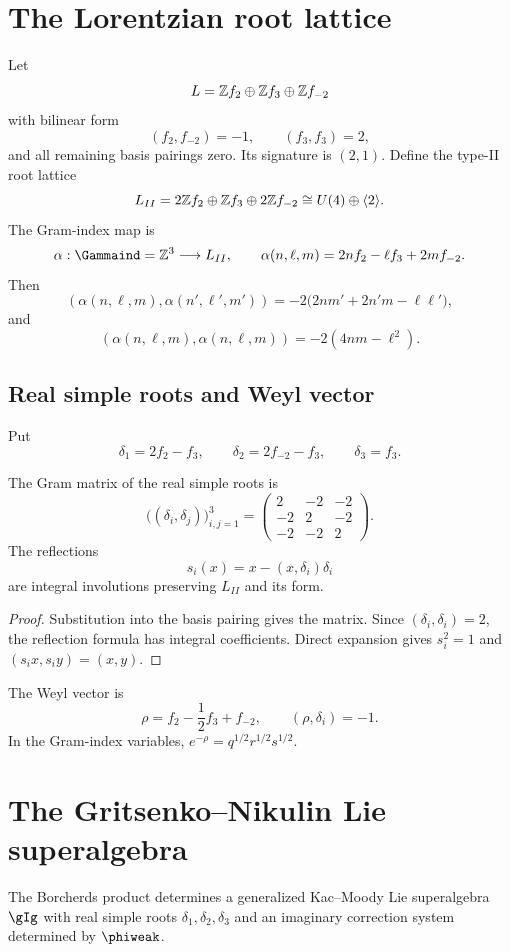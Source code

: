 \chapter{The Lorentzian root lattice}
Let
\[
 L=\mathbb Z f_2\oplus\mathbb Z f_3\oplus\mathbb Z f_{-2}
\]
with bilinear form
\[
 (f_2,f_{-2})=-1,
 \qquad (f_3,f_3)=2,
\]
and all remaining basis pairings zero. Its signature is $(2,1)$. Define the type-II root lattice
\[
 L_{II}=2\mathbb Z f_2\oplus\mathbb Z f_3\oplus2\mathbb Z f_{-2}
 \cong U(4)\oplus\langle 2\rangle.
\]
The Gram-index map is
\[
 \alpha:\Gammaind=\Z^3\longrightarrow L_{II},
 \qquad
 \alpha(n,\ell,m)=2nf_2-\ell f_3+2mf_{-2}.
\]
Then
\[
 (\alpha(n,\ell,m),\alpha(n',\ell',m'))
 =-2\bigl(2nm'+2n'm-\ell\ell'\bigr),
\]
and
\[
 (\alpha(n,\ell,m),\alpha(n,\ell,m))
 =-2(4nm-\ell^2).
\]

\section{Real simple roots and Weyl vector}
Put
\[
 \delta_1=2f_2-f_3,
 \qquad
 \delta_2=2f_{-2}-f_3,
 \qquad
 \delta_3=f_3.
\]

\begin{proposition}
The Gram matrix of the real simple roots is
\[
 \bigl((\delta_i,\delta_j)\bigr)_{i,j=1}^3
 =\begin{pmatrix}
 2&-2&-2\\
 -2&2&-2\\
 -2&-2&2
 \end{pmatrix}.
\]
The reflections
\[
 s_i(x)=x-(x,\delta_i)\delta_i
\]
are integral involutions preserving $L_{II}$ and its form.
\end{proposition}
\begin{proof}
Substitution into the basis pairing gives the matrix. Since $(\delta_i,\delta_i)=2$, the reflection formula has integral coefficients. Direct expansion gives $s_i^2=1$ and $(s_ix,s_iy)=(x,y)$.
\end{proof}

The Weyl vector is
\[
 \rho=f_2-\frac12f_3+f_{-2},
 \qquad (\rho,\delta_i)=-1.
\]
In the Gram-index variables, $e^{-\rho}=q^{1/2}r^{1/2}s^{1/2}$.

\chapter[The denominator algebra]{The Gritsenko--Nikulin Lie superalgebra}
The Borcherds product determines a generalized Kac--Moody Lie superalgebra $\gIg$ with real simple roots $\delta_1,\delta_2,\delta_3$ and an imaginary correction system determined by $\phiweak$.

